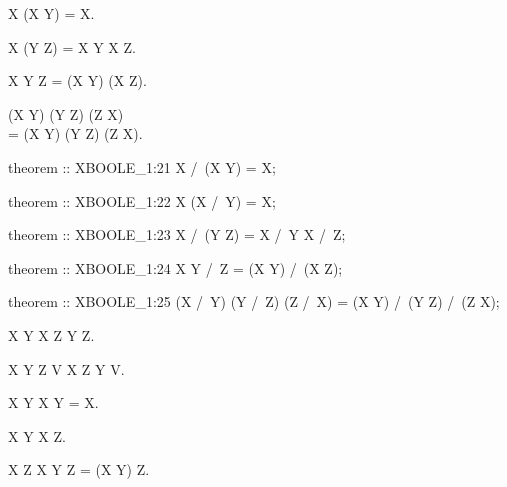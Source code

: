 \begin{paracol}{2}
\begin{theorem}
  X \cup (X \cap Y) = X.
\end{theorem}

\begin{theorem}
  X \cap (Y \cup Z) = X \cap Y \cup X \cap Z.
\end{theorem}

\begin{theorem}
  X \cup Y \cap Z = (X \cup Y) \cap (X \cup Z).
\end{theorem}

\begin{theorem+}
  (X \cap Y) \cup (Y \cap Z) \cup (Z \cap X)\\
  = (X \cup Y) \cap (Y \cup Z) \cap (Z \cup X).
\end{theorem+}

\switchcolumn

\begin{mizar}
theorem :: XBOOLE_1:21
  X /\ (X \/ Y) = X;

theorem :: XBOOLE_1:22
  X \/ (X /\ Y) = X;

theorem :: XBOOLE_1:23
  X /\ (Y \/ Z) = X /\ Y \/ X /\ Z;

theorem :: XBOOLE_1:24
  X \/ Y /\ Z = (X \/ Y) /\ (X \/ Z);

theorem :: XBOOLE_1:25
  (X /\ Y) \/ (Y /\ Z) \/ (Z /\ X)
  = (X \/ Y) /\ (Y \/ Z) /\ (Z \/ X);
\end{mizar}

\switchcolumn*\ensurevspace{5cm}

\begin{theorem}
  X \subset Y \implies X \cap Z \subset Y \cap Z.
\end{theorem}

\begin{theorem}
  X \subset Y \land Z \subset V \implies X \cap Z \subset Y \cap V.
\end{theorem}

\begin{theorem}
  X \subset Y \implies X \cap Y = X.
\end{theorem}

\begin{theorem}
  X \cap Y \subset X \cup Z.
\end{theorem}

\begin{theorem}
  X \subset Z \implies X \cup Y \cap Z = (X \cup Y) \cap Z.
\end{theorem}


\end{paracol}
